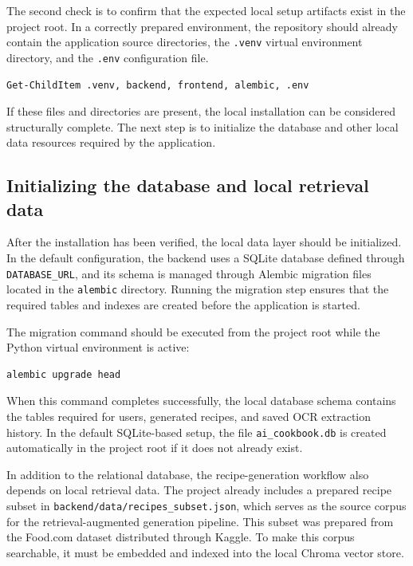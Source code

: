 The second check is to confirm that the expected local setup artifacts
exist in the project root. In a correctly prepared environment, the
repository should already contain the application source directories,
the \texttt{.venv} virtual environment directory, and the
\texttt{.env} configuration file.

\begin{lstlisting}
Get-ChildItem .venv, backend, frontend, alembic, .env
\end{lstlisting}

If these files and directories are present, the local installation can
be considered structurally complete. The next step is to initialize
the database and other local data resources required by the
application.

\subsection{Initializing the database and local retrieval data}

After the installation has been verified, the local data layer should
be initialized. In the default configuration, the backend uses a
SQLite database defined through \texttt{DATABASE\_URL}, and its schema
is managed through Alembic migration files located in the
\texttt{alembic} directory. Running the migration step ensures that
the required tables and indexes are created before the application is
started.

The migration command should be executed from the project root while
the Python virtual environment is active:

\begin{lstlisting}
alembic upgrade head
\end{lstlisting}

When this command completes successfully, the local database schema
contains the tables required for users, generated recipes, and saved
OCR extraction history. In the default SQLite-based setup, the file
\texttt{ai\_cookbook.db} is created automatically in the project root
if it does not already exist.

In addition to the relational database, the recipe-generation workflow
also depends on local retrieval data. The project already includes a
prepared recipe subset in \texttt{backend/data/recipes\_subset.json},
which serves as the source corpus for the retrieval-augmented
generation pipeline. This subset was prepared from the Food.com dataset
distributed through Kaggle. To make this corpus searchable, it must be
embedded and indexed into the local Chroma vector store.

